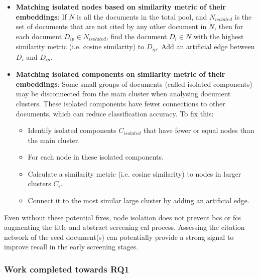 \documentclass[10pt,oneside]{book}
\begin{document}
\begin{itemize}
    \item \textbf{Matching isolated nodes based on similarity metric of their embeddings}: If $N$ is all the documents in the total pool, and $N_{isolated}$ is the set of documents that are not cited by any other document in $N$, then for each document $D_{ip} \in N_{isolated}$, find the document $D_i \in N$ with the highest similarity metric (i.e. cosine similarity) to $D_{ip}$. Add an artificial edge between $D_i$ and $D_{ip}$.
    \item \textbf{Matching isolated components on similarity metric of their embeddings}: Some small groups of documents (called isolated components) may be disconnected from the main cluster when analysing document clusters. These isolated components have fewer connections to other documents, which can reduce classification accuracy. To fix this:
    \begin{itemize}
        \item Identify isolated components $C_{isolated}$ that have fewer or equal nodes than the main cluster.
        \item For each node in these isolated components.
        \item Calculate a similarity metric (i.e. cosine similarity) to nodes in larger clusters $C_i$.
        \item Connect it to the most similar large cluster by adding an artificial edge.
    \end{itemize}

\end{itemize}



Even without these potential fixes, node isolation does not prevent \gls*{bcs} or \gls*{fcs} augmenting the title and abstract screening \gls*{cal} process. Assessing the citation network of the seed document(s) can potentially provide a strong signal to improve recall in the early screening stages.

\subsubsection{Work completed towards RQ1}
\end{document}
